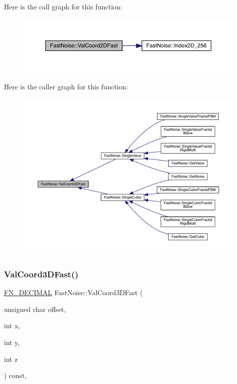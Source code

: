 Here is the call graph for this function\+:
\nopagebreak
\begin{figure}[H]
\begin{center}
\leavevmode
\includegraphics[width=350pt]{class_fast_noise_ace751d0f7929c892937cd97f3e0341a7_cgraph}
\end{center}
\end{figure}
Here is the caller graph for this function\+:
\nopagebreak
\begin{figure}[H]
\begin{center}
\leavevmode
\includegraphics[width=350pt]{class_fast_noise_ace751d0f7929c892937cd97f3e0341a7_icgraph}
\end{center}
\end{figure}
\mbox{\label{class_fast_noise_a8711ebad77216b74f5d248deb024de2f}} 
\subsubsection{\texorpdfstring{Val\+Coord3\+D\+Fast()}{ValCoord3DFast()}}
{\footnotesize\ttfamily \mbox{\hyperlink{_fast_noise_8h_a75a9ef6d2541c4921815b885bfd449c3}{F\+N\+\_\+\+D\+E\+C\+I\+M\+AL}} Fast\+Noise\+::\+Val\+Coord3\+D\+Fast (\begin{DoxyParamCaption}\item[{unsigned char}]{offset,  }\item[{int}]{x,  }\item[{int}]{y,  }\item[{int}]{z }\end{DoxyParamCaption}) const\hspace{0.3cm}{\ttfamily [inline]}, {\ttfamily [private]}}

